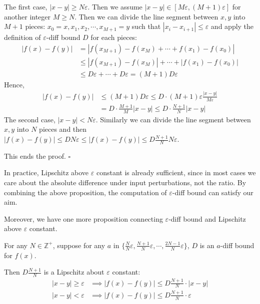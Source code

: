 	The first case, $|x-y|\geq N\varepsilon$. Then we assume $|x-y| \in [M\varepsilon ,  (M+1)\varepsilon]$ for another integer $M\geq N$. Then we can divide the line segment between $x, y$ into $M+1$ pieces: $x_0 = x, x_1, x_2, \cdots, x_{M+1} = y$ such that $|x_i-x_{i+1}| \leq \varepsilon$ and apply the definition of $\varepsilon$-diff bound $D$ for each pieces:\begin{align*}
		|f(x)-f(y)| &= |f(x_{M+1})-f(x_M)+\cdots+f(x_1)-f(x_0)|\\
		&\leq |f(x_{M+1})-f(x_M)|+\cdots+|f(x_1)-f(x_0)|\\
		&\leq D\varepsilon + \cdots +D\varepsilon = (M+1)D\varepsilon
	\end{align*}
	Hence,\begin{align*}
		|f(x)-f(y)| &\leq (M+1)D\varepsilon \leq D\cdot (M+1)\varepsilon \frac{|x-y|}{M\varepsilon}\\
		&= D\cdot\frac{M+1}{M} |x-y|	\leq   D\cdot\frac{N+1}{N} |x-y|		
	\end{align*}
	The second case, $|x-y|< N\varepsilon$. Similarly we can divide the line segment between $x, y$ into $N$ pieces and then $|f(x)-f(y)|\leq D N\varepsilon\leq |f(x)-f(y)|\leq D \frac{N+1}{N} N\varepsilon$.
	
	This ends the proof.
	\hfill $\square$
	
	In practice, Lipschitz above $\varepsilon$ constant is already sufficient, since in most cases we care about the absolute difference under input perturbations, not the ratio. By combining the above proposition, the computation of $\varepsilon$-diff bound can satisfy our aim.
	
	
	Moreover, we have one more proposition connecting $\varepsilon$-diff bound and Lipschitz above $\varepsilon$ constant.
	
	
	\begin{proposition}
		For any $N\in\mathbb{Z}^+$, suppose for any $a$ in $\{\frac{N}{N}\varepsilon,\frac{N+1}{N}\varepsilon,\cdots, \frac{2N-1}{N}\varepsilon\}$, $D$ is an $a$-diff bound for $f(x)$. 
		
		Then $D\frac{N+1}{N}$ is a Lipschitz about $\varepsilon$ constant:\begin{align*}
			|x-y|\geq \varepsilon &\implies |f(x)-f(y)| \leq D\frac{N+1}{N} \cdot |x-y|\\
			|x-y|<\varepsilon &\implies |f(x)-f(y)| \leq D\frac{N+1}{N} \cdot \varepsilon\\
		\end{align*}
	\end{proposition}
	
